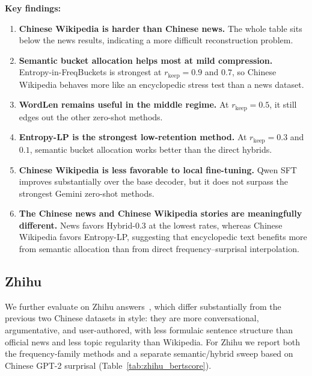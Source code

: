 \documentclass[11pt]{article}
\newcommand{\rkeep}{r_{\mathrm{keep}}}
\begin{document}
\textbf{Key findings:}
\begin{enumerate}
    \item \textbf{Chinese Wikipedia is harder than Chinese news.} The whole table sits below the news results, indicating a more difficult reconstruction problem.
    \item \textbf{Semantic bucket allocation helps most at mild compression.} Entropy-in-FreqBuckets is strongest at $\rkeep=0.9$ and $0.7$, so Chinese Wikipedia behaves more like an encyclopedic stress test than a news dataset.
    \item \textbf{WordLen remains useful in the middle regime.} At $\rkeep=0.5$, it still edges out the other zero-shot methods.
    \item \textbf{Entropy-LP is the strongest low-retention method.} At $\rkeep=0.3$ and $0.1$, semantic bucket allocation works better than the direct hybrids.
    \item \textbf{Chinese Wikipedia is less favorable to local fine-tuning.} Qwen SFT improves substantially over the base decoder, but it does not surpass the strongest Gemini zero-shot methods.
    \item \textbf{The Chinese news and Chinese Wikipedia stories are meaningfully different.} News favors Hybrid-$0.3$ at the lowest rates, whereas Chinese Wikipedia favors Entropy-LP, suggesting that encyclopedic text benefits more from semantic allocation than from direct frequency--surprisal interpolation.
\end{enumerate}

\subsection*{Zhihu}
\label{app:zhihu_eval}

We further evaluate on Zhihu answers~\citep{wang2024zhihukol}, which differ substantially from the previous
two Chinese datasets in style: they are more conversational, argumentative, and
user-authored, with less formulaic sentence structure than official news and less
topic regularity than Wikipedia. For Zhihu we report both the frequency-family
methods and a separate semantic/hybrid sweep based on Chinese GPT-2 surprisal (Table~\ref{tab:zhihu_bertscore}).
\end{document}
